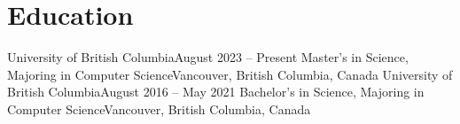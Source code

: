 \section{Education}%
\resumeSubHeadingListStart    
      \resumeSubheading
        {University of British Columbia}{August 2023 – Present}
        {Master's in Science, Majoring in Computer Science}{Vancouver, British Columbia, Canada}
        \resumeItemListStart
        \small{}
        \resumeItemListEnd
    \resumeSubheading
        {University of British Columbia}{August 2016 -- May 2021}
        {Bachelor's in Science, Majoring in Computer Science}{Vancouver, British Columbia, Canada}
        \resumeItemListStart
        \small{}
        \resumeItemListEnd

\resumeSubHeadingListEnd